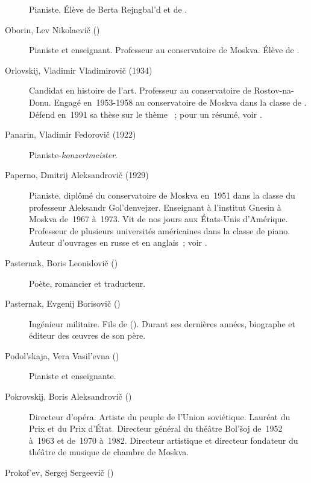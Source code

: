 \begin{description}
 Pianiste.
 Élève de Berta Rejngbal'd et de \VSofronitsky{}.
 \item[Oborin, Lev Nikolaevič (\Dates{1907}{1974})]%
 Pianiste et enseignant.
 Professeur au conservatoire de Moskva.
 Élève de \KIgumnov{}.
 \item[Orlovskij, Vladimir Vladimirovič (1934\dvsborn{})]%
 Candidat en histoire de l'art.
 Professeur au conservatoire de Rostov-na-Donu.
 Engagé en~1953-1958 au conservatoire de Moskva dans la classe de
 \VSofronitsky{}.
 Défend en~1991 sa thèse sur le thème ~;
 pour un résumé, voir \citet{Orlovsky91}.
 \item[Panarin, Vladimir Fedorovič (1922\dvsborn{})]%
 Pianiste-\emph{\foreignlanguage{german}{konzertmeister}}.
 \item[Paperno, Dmitrij Aleksandrovič (1929\dvsborn{})]%
 Pianiste, diplômé du conservatoire de Moskva en~1951 dans la classe du
 professeur Aleksandr Gol'denvejzer.
 Enseignant à l'institut Gnesin à Moskva de~1967 à~1973.
 Vit de nos jours aux États-Unis d'\hbox{Amérique}.
 Professeur de plusieurs universités américaines dans la classe de piano.
 Auteur d'ouvrages en russe et en anglais~; voir \citet{Paperno03}.
 \item[Pasternak, Boris Leonidovič (\Dates{1890}{1960})]%
 Poète, romancier et traducteur.
 \item[Pasternak, Evgenij Borisovič (\Dates{1923}{2012})]%
 Ingénieur militaire.
 Fils de \BPasternak{} ().
 Durant ses dernières années, biographe et éditeur des œuvres de son père.
 \item[Podol'skaja, Vera Vasil'evna (\Dates{1914}{1970})]%
 Pianiste et enseignante.
 \item[Pokrovskij, Boris Aleksandrovič (\Dates{1912}{2009})]%
 Directeur d'opéra.
 Artiste du peuple de l'\hbox{Union} soviétique.
 Lauréat du Prix \Lenin{} et du Prix d'\hbox{État}.
 Directeur général du théâtre Bol'šoj de~1952 à~1963 et de~1970 à~1982.
 Directeur artistique et directeur fondateur du théâtre de musique de
 chambre de Moskva.
 \item[Prokof'ev, Sergej Sergeevič (\Dates{1891}{1953})]%

\end{description}
